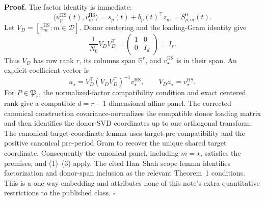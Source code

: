 \textbf{Proof.}
The factor identity is immediate:
\[
 \langle u_p^{\mathrm{HS}}(t),v_m^{\mathrm{HS}}\rangle
 =s_p(t)+b_p(t)^\top z_m=S^0_{p,m}(t).                   \tag{1}
\]
Let \(V_D=[v_m^{\mathrm{HS}}:m\in\mathcal D]\). Donor centering and the loading-Gram identity give
\[
 \frac1{N_0}V_DV_D^\top
 =\begin{pmatrix}1&0\\0&I_d\end{pmatrix}=I_r.          \tag{2}
\]
Thus \(V_D\) has row rank \(r\), its columns span \(\mathbb R^r\), and \(v_\star^{\mathrm{HS}}\) is in their span. An explicit coefficient vector is
\[
 a_\star=V_D^\top(V_DV_D^\top)^{-1}v_\star^{\mathrm{HS}},
 \qquad V_Da_\star=v_\star^{\mathrm{HS}}.              \tag{3}
\]
For \(P\in\mathfrak P_r\), the normalized-factor compatibility condition and exact centered rank give a compatible \(d=r-1\) dimensional affine panel. The corrected canonical construction covariance-normalizes the compatible donor loading matrix and then identifies the donor-SVD coordinates up to one orthogonal transform. The canonical-target-coordinate lemma uses target-pre compatibility and the positive canonical pre-period Gram to recover the unique shared target coordinate. Consequently the canonical panel, including \(m=\star\), satisfies the premises, and (1)--(3) apply. The cited Han--Shah scope lemma identifies factorization and donor-span inclusion as the relevant Theorem~1 conditions. This is a one-way embedding and attributes none of this note's extra quantitative restrictions to the published class. \(\square\)
